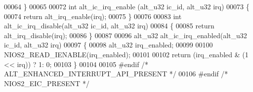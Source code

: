 \begin{DoxyCode}
00064 \}  
00065 
00072 \textcolor{keywordtype}{int} alt\_ic\_irq\_enable (alt_u32 ic\_id, alt_u32 irq)
00073 \{
00074     \textcolor{keywordflow}{return} alt_irq_enable(irq);
00075 \}
00076 
00083 \textcolor{keywordtype}{int} alt\_ic\_irq\_disable(alt_u32 ic\_id, alt_u32 irq)
00084 \{
00085     \textcolor{keywordflow}{return} alt_irq_disable(irq);
00086 \}
00087 
00096 alt_u32 alt\_ic\_irq\_enabled(alt_u32 ic\_id, alt_u32 irq)
00097 \{
00098     alt_u32 irq\_enabled;
00099 
00100     NIOS2_READ_IENABLE(irq\_enabled);
00101 
00102     \textcolor{keywordflow}{return} (irq\_enabled & (1 << irq)) ? 1: 0;
00103 \}
00104 
00105 \textcolor{preprocessor}{#endif }\textcolor{comment}{/* ALT\_ENHANCED\_INTERRUPT\_API\_PRESENT */}\textcolor{preprocessor}{}
00106 \textcolor{preprocessor}{#endif }\textcolor{comment}{/* NIOS2\_EIC\_PRESENT */}\textcolor{preprocessor}{}
\end{DoxyCode}
